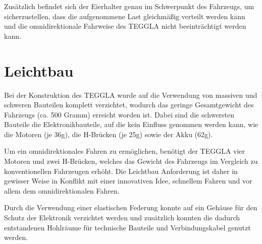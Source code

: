Zusätzlich befindet sich der Eierhalter genau im Schwerpunkt des Fahrzeugs, um sicherzustellen, dass die aufgenommene Last gleichmäßig verteilt werden kann und die omnidirektionale Fahrweise des TEGGLA nicht beeinträchtigt werden kann.



\section{Leichtbau}	

Bei der Konstruktion des TEGGLA wurde auf die Verwendung von massiven und schweren Bauteilen komplett verzichtet, wodurch das geringe Gesamtgewicht des Fahrzeugs (ca. 500 Gramm) erreicht worden ist. 
Dabei sind die schwersten Bauteile die Elektronikbauteile, auf die kein Einfluss genommen werden kann, wie die Motoren (je 36g), die H-Brücken (je 25g) sowie der Akku (62g). 

Um ein omnidirektionales Fahren zu ermöglichen, benötigt der TEGGLA vier Motoren und zwei H-Brücken, welches das Gewicht des Fahrzeugs im Vergleich zu konventionellen Fahrzeugen erhöht. 
Die Leichtbau Anforderung ist daher in gewisser Weise in Konflikt mit einer innovativen Idee, schnellem Fahren und vor allem dem omnidirektionalen Fahren. 

Durch die Verwendung einer elastischen Federung konnte auf ein Gehäuse für den Schutz der Elektronik verzichtet werden und zusätzlich konnten die dadurch entstandenen Hohlräume für technische Bauteile und Verbindungskabel genutzt werden.    
